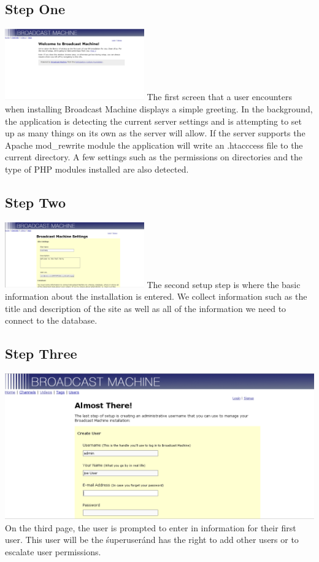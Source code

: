 \documentclass[a4paper,12pt]{report}
\begin{document}
\subsection{Step One}
\includegraphics[width=60mm]{images/setup1.png}
The first screen that a user encounters when installing Broadcast Machine displays a simple greeting.
In the background, the application is detecting the current server settings and is attempting to set up as many things on its own as the server will allow.
If the server supports the Apache mod\_rewrite module the application will write an .htacccess file to the current directory.
A few settings such as the permissions on directories and the type of PHP modules installed are also detected.

\subsection{Step Two}
\includegraphics[width=60mm]{images/setup2.png}
The second setup step is where the basic information about the installation is entered.
We collect information such as the title and description of the site as well as all of the information we need to connect to the database.

\subsection{Step Three}
\includegraphics{images/setup3.png}
On the third page, the user is prompted to enter in information for their first user.
This user will be the \'superuser\' and has the right to add other users or to escalate user permissions.
\end{document}
